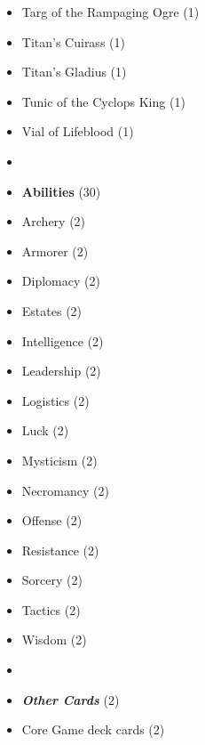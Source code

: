 \begin{multicols*}{3}
\begin{itemize}[leftmargin=0pt, label={}, noitemsep]
  \item Targ of the Rampaging Ogre (1)
  \item Titan's Cuirass (1)
  \item Titan's Gladius (1)
  \item Tunic of the Cyclops King (1)
  \item Vial of Lifeblood (1)
  \item
  \item \textbf{Abilities} (30)
  \item Archery (2)
  \item Armorer (2)
  \item Diplomacy (2)
  \item Estates (2)
  \item Intelligence (2)
  \item Leadership (2)
  \item Logistics (2)
  \item Luck (2)
  \item Mysticism (2)
  \item Necromancy (2)
  \item Offense (2)
  \item Resistance (2)
  \item Sorcery (2)
  \item Tactics (2)
  \item Wisdom (2)
  \item
  \item \textbf{\emph{Other Cards}} (2)
  \item Core Game deck cards (2)
\end{itemize}

\end{multicols*}
